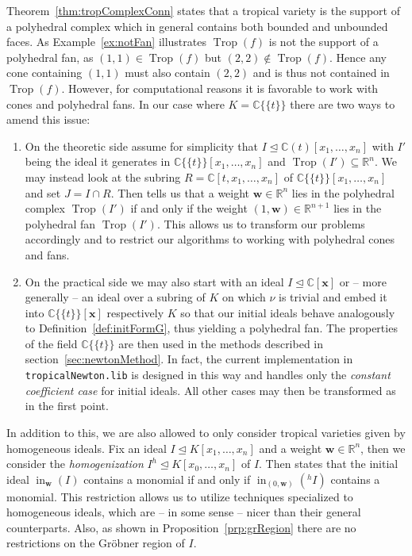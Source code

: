 \documentclass[
  paper=a4,
  titlepage,
  bibliography=totoc,
  listof=totoc,
  pagesize=pdftex
]{scrartcl}
\numberwithin{figure}{section}
\numberwithin{equation}{section}
\numberwithin{table}{section}
\newcommand*\setR{\mathds{R}}
\newcommand*\setC{\mathds{C}}
\newcommand*\puiseux[2]{#1\{\!\{#2\}\!\}}
\newcommand*\CCt{\puiseux{\setC}{t}}
\let\vec\mathbf
\let\idealof\trianglelefteq
\DeclareMathOperator{\Trop}{Trop}
\DeclareMathOperator{\initial}{in}
\theoremstyle{definition}
\numberwithin{definition}{section}
\begin{document}
Theorem~\ref{thm:tropComplexConn} states that a tropical variety is the support of a
polyhedral complex which in general contains both bounded and unbounded faces. As
Example~\ref{ex:notFan} illustrates $\Trop(f)$ is not the support of a polyhedral fan, as
$(1,1) \in \Trop(f)$ but $(2,2) \not\in \Trop(f)$. Hence any cone containing $(1,1)$ must
also contain $(2,2)$ and is thus not contained in $\Trop(f)$. However, for computational
reasons it is favorable to work with cones and polyhedral fans. In our case where $K =
\CCt$ there are two ways to amend this issue:
\begin{enumerate}[label=\arabic*.]
  \item On the theoretic side assume for simplicity that $I \idealof \setC(t)[x_1, \dots,
    x_n]$ with $I'$ being the ideal it generates in $\CCt[x_1, \dots, x_n]$ and $\Trop(I')
    \subseteq \setR^n$. We may instead look at the subring $R = \setC[t, x_1, \dots, x_n]$ of
    $\CCt[x_1, \dots, x_n]$ and set $J = I\cap R$. Then \cite[Lemma~1.1]{compTropVar}
    tells us that a weight $\vec w \in \setR^n$ lies in the polyhedral complex $\Trop(I')$
    if and only if the weight $(1,\vec w) \in \setR^{n+1}$ lies in the polyhedral fan
    $\Trop(I')$. This allows us to transform our problems accordingly and to restrict our
    algorithms to working with polyhedral cones and fans.
  \item On the practical side we may also start with an ideal $I \idealof \setC[\vec x]$
    or -- more generally -- an ideal over a subring of $K$ on which $\nu$ is trivial and
    embed it into $\CCt[\vec x]$ respectively $K$ so that our initial ideals behave
    analogously to Definition~\ref{def:initFormG}, thus yielding a polyhedral fan. The
    properties of the field $\CCt$ are then used in the methods described in
    section~\ref{sec:newtonMethod}. In fact, the current implementation in
    \texttt{tropicalNewton.lib} \cite{tropNewtLib} is designed in this way and handles
    only the \emph{constant coefficient case} for initial ideals. All other cases may then
    be transformed as in the first point.
\end{enumerate}
In addition to this, we are also allowed to only consider tropical varieties given by
homogeneous ideals. Fix an ideal $I\idealof K[x_1, \dots, x_n]$ and a weight $\vec w \in
\setR^n$, then we consider the \emph{homogenization} $I^h \idealof K[x_0, \dots, x_n]$ of
$I$. Then \cite[Lemma~2.2]{compTropVar} states that the initial ideal $\initial_{\vec
w}(I)$ contains a monomial if and only if $\initial_{(0,\vec w)}(^hI)$ contains a
monomial. This restriction allows us to utilize techniques specialized to homogeneous
ideals, which are -- in some sense -- nicer than their general counterparts. Also, as
shown in Proposition~\ref{prp:grRegion} there are no restrictions on the Gröbner region of
$I$.
\end{document}
